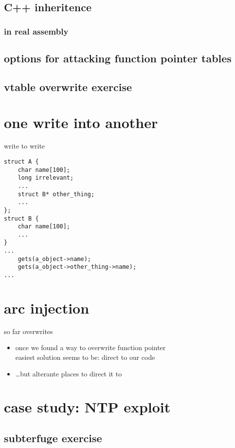 \subsection{C++ inheritence}


\subsubsection{in real assembly}


\subsection{options for attacking function pointer tables}


\subsection{vtable overwrite exercise}





\section{one write into another}

\begin{frame}[fragile]{write to write}
\begin{Verbatim}[fontsize=\small]
struct A {
    char name[100];
    long irrelevant;
    ...
    struct B* other_thing;
    ...
};
struct B {
    char name[100];
    ...
}
...
    gets(a_object->name);
    gets(a_object->other_thing->name);
...
\end{Verbatim}
\end{frame}

\section{arc injection}
\begin{frame}{so far overwrites}
    \begin{itemize}
    \item once we found a way to overwrite function pointer\\
          easiest solution seems to be: direct to our code
    \item \ldots but alterante places to direct it to
    \end{itemize}
\end{frame}



\section{case study: NTP exploit}


\subsection{subterfuge exercise}

